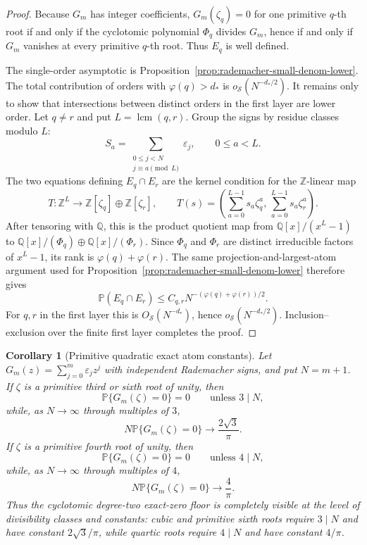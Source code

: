 \documentclass[11pt]{amsart}
\numberwithin{equation}{section}
\newtheorem{corollary}[theorem]{Corollary}
\theoremstyle{definition}
\theoremstyle{remark}
\newcommand{\Prob}{\mathbb P}
\begin{document}
\begin{proof}
Because \(G_m\) has integer coefficients, \(G_m(\zeta_q)=0\) for one primitive
\(q\)-th root if and only if the cyclotomic polynomial \(\Phi_q\) divides
\(G_m\), hence if and only if \(G_m\) vanishes at every primitive \(q\)-th root.
Thus \(E_q\) is well defined.

The single-order asymptotic is Proposition~\ref{prop:rademacher-small-denom-lower}.
The total contribution of orders with \(\varphi(q)>d_*\) is
\(o_{\mathcal S}(N^{-d_*/2})\).  It remains only to show that intersections
between distinct orders in the first layer are lower order.  Let \(q\ne r\) and
put \(L=\operatorname{lcm}(q,r)\).  Group the signs by residue classes modulo
\(L\):
\[
  S_a=\sum_{\substack{0\le j<N\\j\equiv a\pmod L}}\varepsilon_j,
  \qquad 0\le a<L.
\]
The two equations defining \(E_q\cap E_r\) are the kernel condition for the
\(\mathbb Z\)-linear map
\[
  T:\mathbb Z^L\to \mathbb Z[\zeta_q]\oplus\mathbb Z[\zeta_r],\qquad
  T(s)=\left(\sum_{a=0}^{L-1}s_a\zeta_q^a,\,
             \sum_{a=0}^{L-1}s_a\zeta_r^a\right).
\]
After tensoring with \(\mathbb Q\), this is the product quotient map from
\(\mathbb Q[x]/(x^L-1)\) to
\(\mathbb Q[x]/(\Phi_q)\oplus\mathbb Q[x]/(\Phi_r)\).  Since \(\Phi_q\) and
\(\Phi_r\) are distinct irreducible factors of \(x^L-1\), its rank is
\(\varphi(q)+\varphi(r)\).  The same projection-and-largest-atom argument used
for Proposition~\ref{prop:rademacher-small-denom-lower} therefore gives
\[
  \Prob(E_q\cap E_r)\le C_{q,r}N^{-(\varphi(q)+\varphi(r))/2}.
\]
For \(q,r\) in the first layer this is \(O_{\mathcal S}(N^{-d_*})\), hence
\(o_{\mathcal S}(N^{-d_*/2})\).  Inclusion--exclusion over the finite first
layer completes the proof.
\end{proof}

\begin{corollary}[Primitive quadratic exact atom constants]
\label{cor:rademacher-quadratic-atoms}
Let \(G_m(z)=\sum_{j=0}^m\varepsilon_jz^j\) with independent Rademacher signs,
and put \(N=m+1\).  If \(\zeta\) is a primitive third or sixth root of unity,
then
\[
  \Prob\{G_m(\zeta)=0\}=0\qquad\text{unless }3\mid N,
\]
while, as \(N\to\infty\) through multiples of \(3\),
\[
  N\Prob\{G_m(\zeta)=0\}\longrightarrow \frac{2\sqrt3}{\pi}.
\]
If \(\zeta\) is a primitive fourth root of unity, then
\[
  \Prob\{G_m(\zeta)=0\}=0\qquad\text{unless }4\mid N,
\]
while, as \(N\to\infty\) through multiples of \(4\),
\[
  N\Prob\{G_m(\zeta)=0\}\longrightarrow \frac4\pi.
\]
Thus the cyclotomic degree-two exact-zero floor is completely visible at the
level of divisibility classes and constants: cubic and primitive sixth roots
require \(3\mid N\) and have constant \(2\sqrt3/\pi\), while quartic roots
require \(4\mid N\) and have constant \(4/\pi\).
\end{corollary}
\end{document}
